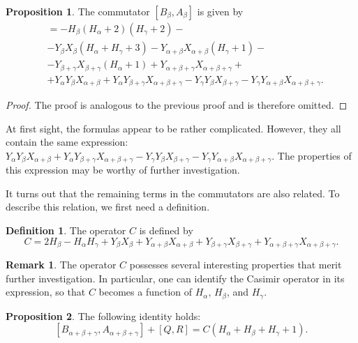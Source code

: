 \documentclass[twoside,a4paper,12pt]{article}
\theoremstyle{definition}
\newtheorem{definition}{Definition}
\newtheorem{remark}{Remark}
\newtheorem{proposition}{Proposition}
\begin{document}
\begin{proposition}\label{bab}
	The commutator $[B_\beta,A_\beta]$ is given by
	\begin{align*}
		[B_\beta,A_\beta]&=-H_\beta(H_\alpha+2)(H_\gamma+2)-\\
		&-Y_\beta X_\beta(H_\alpha+H_\gamma+3)
		-Y_{\alpha+\beta}X_{\alpha+\beta}(H_\gamma+1)-\\
		&-Y_{\beta+\gamma}X_{\beta+\gamma}(H_\alpha+1)
		+Y_{\alpha+\beta+\gamma}X_{\alpha+\beta+\gamma}+\\
		&+Y_\alpha Y_\beta X_{\alpha+\beta}
		+Y_\alpha Y_{\beta+\gamma}X_{\alpha+\beta+\gamma}
		-Y_\gamma Y_\beta X_{\beta+\gamma}
		-Y_\gamma Y_{\alpha+\beta}X_{\alpha+\beta+\gamma}.
	\end{align*}
\end{proposition}

\begin{proof}
	The proof is analogous to the previous proof and is therefore omitted.
\end{proof}

At first sight, the formulas appear to be rather complicated.
However, they all contain the same expression:
$Y_\alpha Y_\beta X_{\alpha+\beta}
+Y_\alpha Y_{\beta+\gamma}X_{\alpha+\beta+\gamma}
-Y_\gamma Y_\beta X_{\beta+\gamma}
-Y_\gamma Y_{\alpha+\beta}X_{\alpha+\beta+\gamma}$.
The properties of this expression may be worthy of further investigation.

It turns out that the remaining terms in the commutators are also related. To
describe this relation, we first need a definition.

\begin{definition}
	The operator $C$ is defined by
	\begin{equation*}
		C=2H_\beta-H_\alpha H_\gamma+Y_\beta X_\beta
		+Y_{\alpha+\beta}X_{\alpha+\beta}+Y_{\beta+\gamma}X_{\beta+\gamma}
		+Y_{\alpha+\beta+\gamma}X_{\alpha+\beta+\gamma}.
	\end{equation*}
\end{definition}

\begin{remark}
	The operator $C$ possesses several interesting properties that merit further
	investigation. In particular, one can identify the Casimir operator in its
	expression, so that $C$ becomes a function of $H_\alpha$, $H_\beta$, and
	$H_\gamma$.
\end{remark}

\begin{proposition}
	The following identity holds:
	\begin{equation}\label{aqr}
		[B_{\alpha+\beta+\gamma},A_{\alpha+\beta+\gamma}]+[Q,R]=
		C(H_\alpha+H_\beta+H_\gamma+1).
	\end{equation}
\end{proposition}
\end{document}
